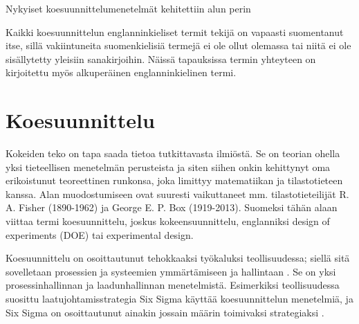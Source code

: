 \documentclass[12pt,a4paper,finnish]{tutthesis}
\begin{document}
Nykyiset koesuunnittelumenetelmät kehitettiin alun perin


Kaikki koesuunnittelun englanninkieliset termit tekijä on vapaasti
suomentanut itse, sillä vakiintuneita suomenkielisiä termejä ei
ole ollut olemassa tai niitä ei ole sisällytetty yleisiin
sanakirjoihin. Näissä tapauksissa termin yhteyteen on kirjoitettu
myös alkuperäinen englanninkielinen termi.




\chapter{Koesuunnittelu}
\label{ch:doe}

Kokeiden teko on tapa saada tietoa tutkittavasta ilmiöstä. Se on teorian
ohella yksi tieteellisen menetelmän perusteista ja siten siihen onkin
kehittynyt oma erikoistunut teoreettinen runkonsa, joka limittyy matematiikan ja
tilastotieteen kanssa. Alan muodostumiseen ovat suuresti vaikuttaneet mm.
tilastotieteilijät R. A. Fisher (1890-1962) ja George E. P. Box (1919-2013).
Suomeksi tähän alaan viittaa termi koesuunnittelu, joskus kokeensuunnittelu,
englanniksi design of experiments (DOE) tai experimental design.

Koesuunnittelu on osoittautunut tehokkaaksi työkaluksi teollisuudessa; siellä sitä
sovelletaan prosessien
ja systeemien ymmärtämiseen ja hallintaan \parencite{Antony2006} . Se on yksi prosessinhallinnan
ja laadunhallinnan menetelmistä. Esimerkiksi teollisuudessa suosittu laatujohtamisstrategia
Six Sigma käyttää koesuunnittelun menetelmiä, ja Six Sigma on osoittautunut
ainakin jossain määrin
toimivaksi strategiaksi \parencite{Dusharme2001}.
\end{document}
